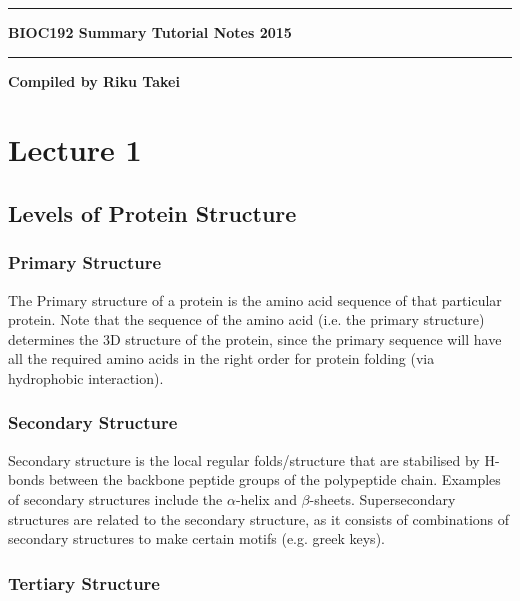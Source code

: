 \documentclass[a4paper, 12pt]{report}
\newcommand{\HRule}{\rule {\linewidth}{0.5mm}}
\newcommand{\mychapter}[2]{
    \setcounter{chapter}{#1}
    \setcounter{section}{0}
    \chapter*{#2}
    \addcontentsline{toc}{chapter}{#2}
}
\begin{document}
\begin{titlepage}

\begin{center}

\HRule
\vspace{0.4cm}
\Huge{\textbf{BIOC192 Summary Tutorial Notes 2015}}
\HRule

\vfill
\LARGE{\textbf{Compiled by Riku Takei}}

\end{center}

\end{titlepage}



%

\mychapter{1}{Lecture 1}

\section{Levels of Protein Structure}

\subsection{Primary Structure}

The Primary structure of a protein is the amino acid sequence of that particular protein.
Note that the sequence of the amino acid (i.e. the primary structure) determines the 3D structure of the protein, since the primary sequence will have all the required amino acids in the right order for protein folding (via hydrophobic interaction).

\subsection{Secondary Structure}

Secondary structure is the local regular folds/structure that are stabilised by H-bonds between the backbone peptide groups of the polypeptide chain.
Examples of secondary structures include the $\alpha$-helix and $\beta$-sheets.
Supersecondary structures are related to the secondary structure, as it consists of combinations of secondary structures to make certain motifs (e.g. greek keys).

\subsection{Tertiary Structure}
\end{document}
